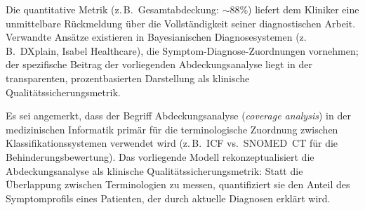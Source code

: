 \documentclass[11pt,a4paper]{article}
\begin{document}
Die quantitative Metrik (z.\,B.\ \glqq Gesamtabdeckung: $\sim$88\%\grqq{}) liefert dem Kliniker eine unmittelbare R\"uckmeldung \"uber die Vollst\"andigkeit seiner diagnostischen Arbeit. Verwandte Ans\"atze existieren in Bayesianischen Diagnosesystemen (z.\,B.\ DXplain, Isabel Healthcare), die Symptom-Diagnose-Zuordnungen vornehmen; der spezifische Beitrag der vorliegenden Abdeckungsanalyse liegt in der transparenten, prozentbasierten Darstellung als klinische Qualit\"atssicherungsmetrik.

Es sei angemerkt, dass der Begriff \glqq Abdeckungsanalyse\grqq{} (\textit{coverage analysis}) in der medizinischen Informatik prim\"ar f\"ur die terminologische Zuordnung zwischen Klassifikationssystemen verwendet wird (z.\,B.\ ICF vs.\ SNOMED~CT f\"ur die Behinderungsbewertung). Das vorliegende Modell rekonzeptualisiert die Abdeckungsanalyse als klinische Qualit\"atssicherungsmetrik: Statt die \"Uberlappung zwischen Terminologien zu messen, quantifiziert sie den Anteil des Symptomprofils eines Patienten, der durch aktuelle Diagnosen erkl\"art wird.
\end{document}
